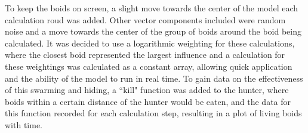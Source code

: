 \documentclass[
reprint,
showpacs,preprintnumbers,
amsmath,amssymb,
prl,
]{revtex4-1}
\begin{document}
To keep the boids on screen, a slight move towards the center of the model each calculation roud was added.
Other vector components included were random noise and a move towards the center of the group of boids around the boid being calculated.
It was decided to use a logarithmic weighting for these calculations, where the closest boid represented the largest influence and a calculation for these weightings was calculated as a constant array, allowing quick application and the ability of the model to run in real time.
To gain data on the effectiveness of this swarming and hiding, a ``kill" function was added to the hunter, where boids within a certain distance of the hunter would be eaten, and the data for this function recorded for each calculation step, resulting in a plot of living boids with time.


	
	
\end{document}
